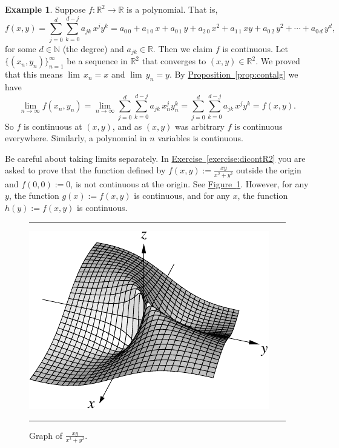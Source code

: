 \documentclass[12pt]{book}
\newenvironment{myfigureht}{%
\begin{figure}[h!t]
\noindent\rule{\textwidth}{0.4pt}\vspace{12pt}\par\centering}%
{\par\noindent\rule{\textwidth}{0.4pt}
\end{figure}}
\newcommand{\R}{{\mathbb{R}}}
\newcommand{\N}{{\mathbb{N}}}
\theoremstyle{plain}
\theoremstyle{remark}
\theoremstyle{definition}
\theoremstyle{exercise}
\theoremstyle{example}
\newtheorem{example}[thm]{Example}
\newcommand{\figureref}[1]{\hyperref[#1]{Figure~\ref*{#1}}}
\newcommand{\exerciseref}[1]{\hyperref[#1]{Exercise~\ref*{#1}}}
\newcommand{\propref}[1]{\hyperref[#1]{Proposition~\ref*{#1}}}
\begin{document}
\begin{example}
Suppose $f \colon \R^2 \to \R$ is a polynomial.  That is,
\begin{equation*}
f(x,y) =
\sum_{j=0}^d
\sum_{k=0}^{d-j}
a_{jk}\,x^jy^k =
a_{0\,0} + a_{1\,0} \, x +
a_{0\,1} \, y+  
a_{2\,0} \, x^2+  
a_{1\,1} \, xy+  
a_{0\,2} \, y^2+ \cdots +
a_{0\,d} \, y^d ,
\end{equation*}
for some $d \in \N$ (the degree) and $a_{jk} \in \R$.  Then we claim 
$f$ is continuous.  Let $\{ (x_n,y_n) \}_{n=1}^\infty$ be a sequence
in $\R^2$ that converges to $(x,y) \in \R^2$.  We proved that this
means $\lim\, x_n = x$ and $\lim\, y_n = y$.
By \propref{prop:contalg} we have
\begin{equation*}
\lim_{n\to\infty}
f(x_n,y_n) =
\lim_{n\to\infty}
\sum_{j=0}^d
\sum_{k=0}^{d-j}
a_{jk} \, x_n^jy_n^k 
=
\sum_{j=0}^d
\sum_{k=0}^{d-j}
a_{jk} \, x^jy^k
=
f(x,y) .
\end{equation*}
So $f$ is continuous at $(x,y)$, and as $(x,y)$ was arbitrary $f$ is
continuous everywhere.  Similarly, a
polynomial in $n$ variables is continuous.
\end{example}

Be careful about taking limits separately.  In \exerciseref{exercise:dicontR2}
you are asked to prove that the function defined by $f(x,y) := \frac{xy}{x^2+y^2}$
outside the origin and $f(0,0) := 0$, is not continuous at the origin.  See
\figureref{fig:xyxsqysq}.
However, for any $y$, the function $g(x) := f(x,y)$ is
continuous,
and for any $x$, the function $h(y) := f(x,y)$ is continuous.
\begin{myfigureht}
\includegraphics{figures/xyxsqysq}
\caption{Graph of $\frac{xy}{x^2+y^2}$.\label{fig:xyxsqysq}}
\end{myfigureht}
\end{document}
